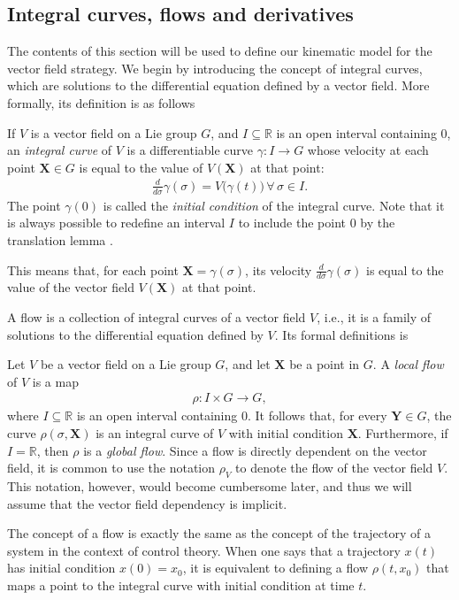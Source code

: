 \subsection{Integral curves, flows and derivatives}
The contents of this section will be used to define our kinematic model for the vector field strategy. We begin by introducing the concept of integral curves, which are solutions to the differential equation defined by a vector field. More formally, its definition is as follows
\begin{definition}
    If $V$ is a vector field on a Lie group $G$, and $I\subseteq \mathbb{R}$ is an open interval containing $0$, an \emph{integral curve} of $V$ is a differentiable curve $\gamma:I\to G$ whose velocity at each point $\mathbf{X}\in G$ is equal to the value of $V(\mathbf{X})$ at that point:
    \begin{align*}
        \frac{d}{d\sigma}\gamma(\sigma) = V\bigl(\gamma(t)\bigr)\,\forall\,\sigma\in I.
    \end{align*}
    The point $\gamma(0)$ is called the \emph{initial condition} of the integral curve. Note that it is always possible to redefine an interval $I$ to include the point $0$ by the translation lemma \citep[p. 208]{Lee2012}.
\end{definition}
This means that, for each point $\mathbf{X}=\gamma(\sigma)$, its velocity $\frac{d}{d\sigma}\gamma(\sigma)$ is equal to the value of the vector field $V(\mathbf{X})$ at that point.

A flow is a collection of integral curves of a vector field $V$, i.e., it is a family of solutions to the differential equation defined by $V$. Its formal definitions is
\begin{definition}
    Let $V$ be a vector field on a Lie group $G$, and let $\mathbf{X}$ be a point in $G$. A \emph{local flow} of $V$ is a map
    \begin{align*}
        \rho : I \times G \to G,
    \end{align*}
    where $I\subseteq\mathbb{R}$ is an open interval containing $0$. It follows that, for every $\mathbf{Y}\in G$, the curve $\rho(\sigma, \mathbf{X})$ is an integral curve of $V$ with initial condition $\mathbf{X}$. Furthermore, if $I=\mathbb{R}$, then $\rho$ is a \emph{global flow}. Since a flow is directly dependent on the vector field, it is common to use the notation $\rho_V$ to denote the flow of the vector field $V$. This notation, however, would become cumbersome later, and thus we will assume that the vector field dependency is implicit.
\end{definition}
The concept of a flow is exactly the same as the concept of the trajectory of a system in the context of control theory. When one says that a trajectory $x(t)$ has initial condition $x(0)=x_0$, it is equivalent to defining a flow $\rho(t, x_0)$ that maps a point to the integral curve with initial condition at time $t$. 

